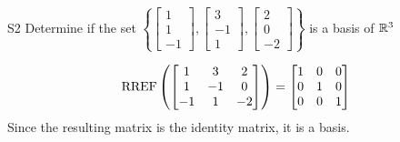 \documentclass{sbgLAquiz}
\begin{document}
\begin{problem}{S2}
Determine if the set $\left\{\begin{bmatrix} 1 \\ 1 \\ -1 \end{bmatrix}, \begin{bmatrix} 3 \\ -1 \\ 1 \end{bmatrix},\begin{bmatrix} 2 \\ 0 \\ -2 \end{bmatrix}\right\}$ is a basis of $\mathbb{R}^3$
\end{problem}
\begin{solution}
$$\operatorname{RREF}\left(\begin{bmatrix} 1 & 3 & 2 \\ 1 & -1 & 0 \\ -1 & 1 & -2 \end{bmatrix} \right)= \begin{bmatrix} 1 & 0 &0 \\ 0 & 1 & 0 \\ 0 & 0 & 1\end{bmatrix}$$
Since the resulting matrix is the identity matrix, it is a basis.
\end{solution}
\end{document}
